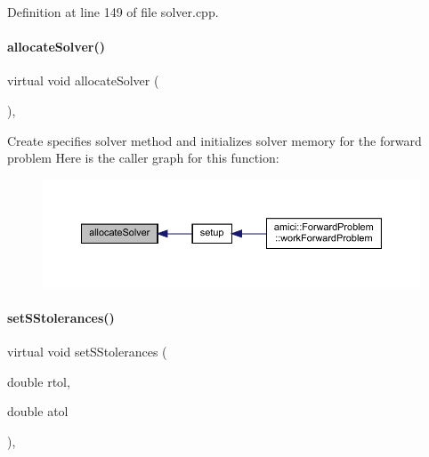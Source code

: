 Definition at line 149 of file solver.\+cpp.

\mbox{\label{classamici_1_1_solver_a0ae4930d2f6fa37ebcc55e334012fd6d}} 
\paragraph{\texorpdfstring{allocate\+Solver()}{allocateSolver()}}
{\footnotesize\ttfamily virtual void allocate\+Solver (\begin{DoxyParamCaption}{ }\end{DoxyParamCaption})\hspace{0.3cm}{\ttfamily [protected]}, {}}

Create specifies solver method and initializes solver memory for the forward problem Here is the caller graph for this function\+:
\nopagebreak
\begin{figure}[H]
\begin{center}
\leavevmode
\includegraphics[width=350pt]{classamici_1_1_solver_a0ae4930d2f6fa37ebcc55e334012fd6d_icgraph}
\end{center}
\end{figure}
\mbox{\label{classamici_1_1_solver_a6a688afa51ec71eded6c8801faaafac3}} 
\paragraph{\texorpdfstring{set\+S\+Stolerances()}{setSStolerances()}}
{\footnotesize\ttfamily virtual void set\+S\+Stolerances (\begin{DoxyParamCaption}\item[{double}]{rtol,  }\item[{double}]{atol }\end{DoxyParamCaption})\hspace{0.3cm}{\ttfamily [protected]}, {}}

